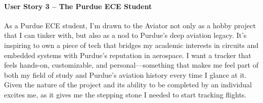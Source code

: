 \paragraph{User Story 3 – The Purdue ECE Student\newline}
	As a Purdue ECE student, I’m drawn to the Aviator not only as a hobby project that I can tinker with, but also as a nod to Purdue’s deep aviation legacy. 
    It’s inspiring to own a piece of tech that bridges my academic interests in circuits and embedded systems with Purdue’s reputation in aerospace. 
    I want a tracker that feels hands-on, customizable, and personal—something that makes me feel part of both my field of study and Purdue’s aviation history every time I glance at it. 
    Given the nature of the project and its ability to be completed by an individual excites me, as it gives me the stepping stone I needed to start tracking flights.
